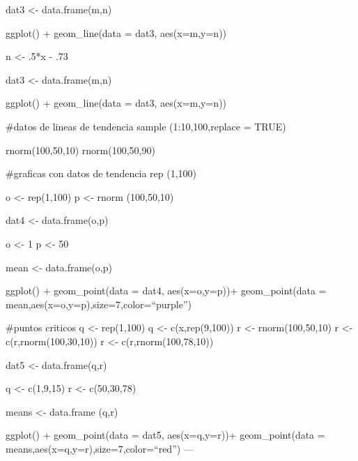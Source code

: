 \documentclass[
  letterpaper,
  DIV=11,
  numbers=noendperiod]{scrartcl}
\begin{document}
dat3 \textless- data.frame(m,n)

ggplot() + geom\_line(data = dat3, aes(x=m,y=n))

n \textless- .5*x - .73

dat3 \textless- data.frame(m,n)

ggplot() + geom\_line(data = dat3, aes(x=m,y=n))

\#datos de lineas de tendencia sample (1:10,100,replace = TRUE)

rnorm(100,50,10) rnorm(100,50,90)

\#graficas con datos de tendencia rep (1,100)

o \textless- rep(1,100) p \textless- rnorm (100,50,10)

dat4 \textless- data.frame(o,p)

o \textless- 1 p \textless- 50

mean \textless- data.frame(o,p)

ggplot() + geom\_point(data = dat4, aes(x=o,y=p))+ geom\_point(data =
mean,aes(x=o,y=p),size=7,color=``purple'')

\#puntos criticos q \textless- rep(1,100) q \textless- c(x,rep(9,100)) r
\textless- rnorm(100,50,10) r \textless- c(r,rnorm(100,30,10)) r
\textless- c(r,rnorm(100,78,10))

dat5 \textless- data.frame(q,r)

q \textless- c(1,9,15) r \textless- c(50,30,78)

means \textless- data.frame (q,r)

ggplot() + geom\_point(data = dat5, aes(x=q,y=r))+ geom\_point(data =
means,aes(x=q,y=r),size=7,color=``red'') ---
\end{document}
